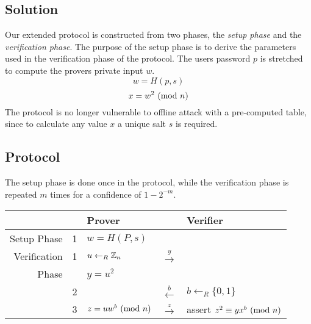 \subsection{Solution}
Our extended protocol is constructed from two phases, the \textit{setup phase} and the \textit{verification phase}.
The purpose of the setup phase is to derive the parameters used in the verification phase of the protocol.
The users password $p$ is stretched to compute the provers private input $w$.
$$w = H(p, s)$$
$$x = w^2 \ (\mathrm{mod}\ n)$$
The protocol is no longer vulnerable to offline attack with a pre-computed table, since to calculate any value $x$ a unique salt $s$ is required.

\subsection{Protocol}
The setup phase is done once in the protocol, while the verification phase is repeated $m$ times for a confidence of $1 - 2^{-m}$.

\begin{center}
	\begin{tabular}{rrl|c|l}
  		& & Prover & & Verifier\\
  		\hline
		Setup Phase & 1 & $w = H(P, s)$ & & \\
		\hline
		Verification & 1 & $u \leftarrow_R \Bbb{Z}_{n}$ & $\xrightarrow{y}$ \\
		Phase& & $y = u^2$ & \\
		& 2 & & $\xleftarrow{b}$ & $b \leftarrow_R \{0, 1\} $ \\
		& 3 & $z = uw^b \ (\mathrm{mod}\ n) $ & $\xrightarrow{z}$ & assert $z^2 \equiv yx^b \ (\mathrm{mod}\ n)$\\ 
	\end{tabular}
\end{center}

%
%
%





